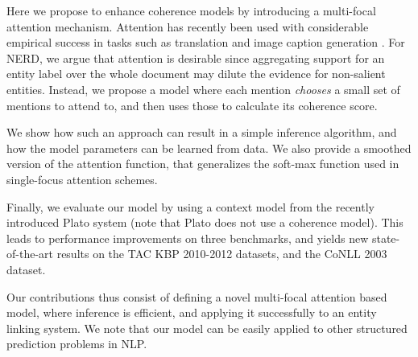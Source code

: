 Here we propose to enhance coherence models by introducing a multi-focal attention mechanism. Attention has recently been used with considerable empirical success in tasks such as translation \cite{bahdanau2014neural} and image caption generation \cite{xu2015show}. For NERD, we argue that attention is desirable since  aggregating support for an entity label over the whole document may dilute the evidence for non-salient entities. Instead, we propose a model where each mention {\em chooses} a small set of mentions to attend to, and then uses those to calculate its coherence score. 

We show how such an approach can result in a simple inference algorithm, and how the model parameters can be  learned from data. We also
provide a smoothed version of the attention function, that generalizes the soft-max function used in single-focus attention schemes. 

Finally, we evaluate our model by using a context model from the recently introduced Plato system \cite{Lazic2015} (note that Plato does not use a coherence model). This leads to performance improvements on three benchmarks, and yields new state-of-the-art results on the TAC KBP 2010-2012 datasets, and the CoNLL 2003 dataset.

Our contributions thus consist of defining a novel multi-focal attention based model, where inference is efficient, and applying it successfully to an entity linking system. We note that our model can be easily applied to other structured prediction problems in NLP.


